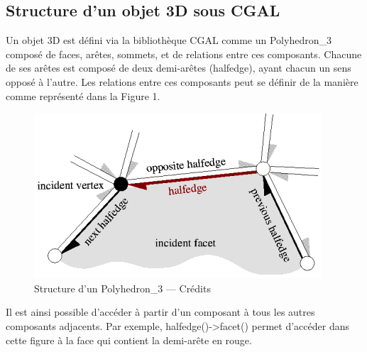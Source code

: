 \documentclass[a4paper,french]{report}
\begin{document}
			\subsection{Structure d'un objet 3D sous CGAL}
				Un objet 3D est défini via la bibliothèque CGAL comme un Polyhedron\_3 composé de faces, arêtes, sommets, et de relations entre ces composants. Chacune de ses arêtes est composé de deux demi-arêtes (halfedge), ayant chacun un sens opposé à l'autre. Les relations entre ces composants peut se définir de la manière comme représenté dans la Figure 1. \par
				\begin{figure}[h]
					\centering
					\includegraphics{halfedge_small.png}
					\caption{Structure d'un Polyhedron\_3 --- Crédits \cite{CGAL} }
				\end{figure}
				Il est ainsi possible d'accéder à partir d'un composant à tous les autres composants adjacents. Par exemple, halfedge()-\textgreater facet() permet d'accéder dans cette figure à la face qui contient la demi-arête en rouge.
				
\end{document}
